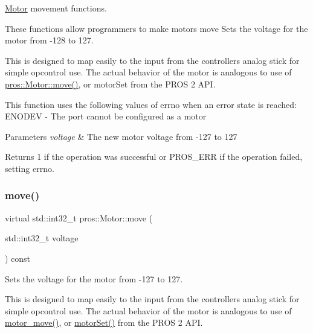 \hyperlink{classpros_1_1Motor}{Motor} movement functions. 

These functions allow programmers to make motors move Sets the voltage for the motor from -\/128 to 127.

This is designed to map easily to the input from the controller\textquotesingle{}s analog stick for simple opcontrol use. The actual behavior of the motor is analogous to use of \hyperlink{classpros_1_1Motor_a7ea9aedd4e12844be2584dc3f4b7a4bf}{pros\+::\+Motor\+::move()}, or motor\+Set from the P\+R\+OS 2 A\+PI.

This function uses the following values of errno when an error state is reached\+: E\+N\+O\+D\+EV -\/ The port cannot be configured as a motor


\begin{DoxyParams}{Parameters}
{\em voltage} & The new motor voltage from -\/127 to 127\\
\hline
\end{DoxyParams}
\begin{DoxyReturn}{Returns}
1 if the operation was successful or P\+R\+O\+S\+\_\+\+E\+RR if the operation failed, setting errno. 
\end{DoxyReturn}
\mbox{\label{classpros_1_1Motor_a7ea9aedd4e12844be2584dc3f4b7a4bf}} 
\subsubsection{\texorpdfstring{move()}{move()}}
{\footnotesize\ttfamily virtual std\+::int32\+\_\+t pros\+::\+Motor\+::move (\begin{DoxyParamCaption}\item[{std\+::int32\+\_\+t}]{voltage }\end{DoxyParamCaption}) const\hspace{0.3cm}{\ttfamily [virtual]}}



Sets the voltage for the motor from -\/127 to 127. 

This is designed to map easily to the input from the controller\textquotesingle{}s analog stick for simple opcontrol use. The actual behavior of the motor is analogous to use of \hyperlink{motors_8h_a7da9bf1e229e50bfeeaecf026a6d0d08}{motor\+\_\+move()}, or \hyperlink{api__legacy_8h_a59a0d6bd050cd259ad488e68f856ae81}{motor\+Set()} from the P\+R\+OS 2 A\+PI.

